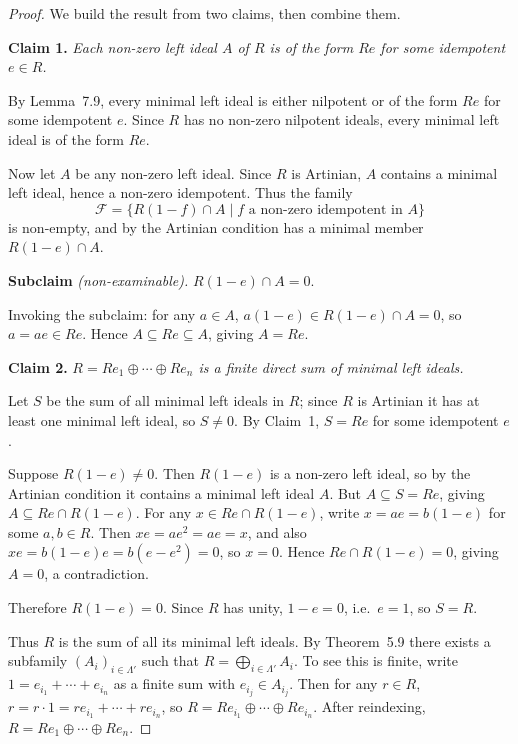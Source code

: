 \documentclass[12pt]{article}
\begin{document}
\begin{proof}
We build the result from two claims, then combine them.

\medskip
\noindent\textbf{Claim 1.} \textit{Each non-zero left ideal $A$ of $R$ is of the form $Re$ for some idempotent $e \in R$.}

\smallskip
By Lemma~7.9, every minimal left ideal is either nilpotent or of the form $Re$ for some idempotent $e$. Since $R$ has no non-zero nilpotent ideals, every minimal left ideal is of the form $Re$.

Now let $A$ be any non-zero left ideal. Since $R$ is Artinian, $A$ contains a minimal left ideal, hence a non-zero idempotent. Thus the family
\[
  \mathcal{F} = \{ R(1-f) \cap A \mid f \text{ a non-zero idempotent in } A \}
\]
is non-empty, and by the Artinian condition has a minimal member $R(1-e) \cap A$.

\medskip
\noindent\textbf{Subclaim} \textit{(non-examinable).} $R(1-e) \cap A = 0$.

\medskip
Invoking the subclaim: for any $a \in A$, $a(1-e) \in R(1-e) \cap A = 0$, so $a = ae \in Re$. Hence $A \subseteq Re \subseteq A$, giving $A = Re$.

\medskip
\noindent\textbf{Claim 2.} \textit{$R = Re_1 \oplus \cdots \oplus Re_n$ is a finite direct sum of minimal left ideals.}

\smallskip
Let $S$ be the sum of all minimal left ideals in $R$; since $R$ is Artinian it has at least one minimal left ideal, so $S \neq 0$. By Claim~1, $S = Re$ for some idempotent $e$.

Suppose $R(1-e) \neq 0$. Then $R(1-e)$ is a non-zero left ideal, so by the Artinian condition it contains a minimal left ideal $A$. But $A \subseteq S = Re$, giving $A \subseteq Re \cap R(1-e)$. For any $x \in Re \cap R(1-e)$, write $x = ae = b(1-e)$ for some $a, b \in R$. Then $xe = ae^2 = ae = x$, and also $xe = b(1-e)e = b(e - e^2) = 0$, so $x = 0$. Hence $Re \cap R(1-e) = 0$, giving $A = 0$, a contradiction.

Therefore $R(1-e) = 0$. Since $R$ has unity, $1 - e = 0$, i.e.\ $e = 1$, so $S = R$.

Thus $R$ is the sum of all its minimal left ideals. By Theorem~5.9 there exists a subfamily $(A_i)_{i \in \Lambda'}$ such that $R = \bigoplus_{i \in \Lambda'} A_i$. To see this is finite, write $1 = e_{i_1} + \cdots + e_{i_n}$ as a finite sum with $e_{i_j} \in A_{i_j}$. Then for any $r \in R$, $r = r \cdot 1 = re_{i_1} + \cdots + re_{i_n}$, so $R = Re_{i_1} \oplus \cdots \oplus Re_{i_n}$. After reindexing, $R = Re_1 \oplus \cdots \oplus Re_n$.


\end{proof}
\end{document}
